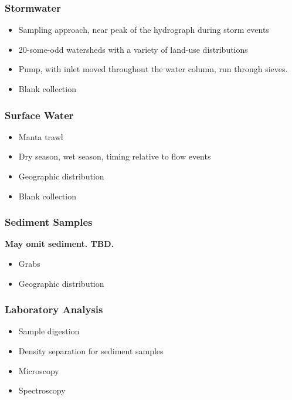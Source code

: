 \documentclass[draft]{jgr/agujournal2019}
\begin{document}
\subsubsection{Stormwater}

\begin{itemize}
\item Sampling approach, near peak of the hydrograph during storm events
\item 20-some-odd watersheds with a variety of land-use distributions
\item Pump, with inlet moved throughout the water column, run through sieves.
\item Blank collection
\end{itemize}

\subsubsection{Surface Water}

\begin{itemize}
\item Manta trawl
\item Dry season, wet season, timing relative to flow events
\item Geographic distribution
\item Blank collection
\end{itemize}
  
\subsubsection{Sediment Samples}

{\bf May omit sediment.  TBD.}
              
\begin{itemize}
\item Grabs
\item Geographic distribution
\end{itemize}

\subsubsection{Laboratory Analysis}

\begin{itemize}
\item Sample digestion
\item Density separation for sediment samples
\item Microscopy
\item Spectroscopy
\end{itemize}
\end{document}
